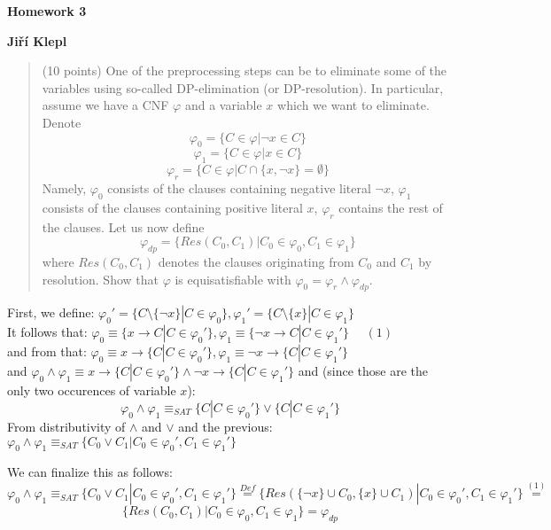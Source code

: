 \documentclass[a4paper,12pt]{article} %
\begin{document}
\begin{center}
    {\Large \bf Homework 3}
    \vspace{2mm}

    {\bf Jiří Klepl}

\end{center}

\vspace{0.4cm}

\begin{quote}
    (10 points) One of the preprocessing steps can be to eliminate some of the variables using so-called
DP-elimination (or DP-resolution). In particular, assume we have a CNF $\varphi$ and a variable $x$ which we want to eliminate. Denote
$$\varphi_0 = \{C \in \varphi | \neg x \in C\}$$
$$\varphi_1 = \{C \in \varphi | x \in C\}$$
$$\varphi_r = \{C \in \varphi | C \cap \{x, \neg x\} = \emptyset\}$$
Namely, $\varphi_0$ consists of the clauses containing negative literal $\neg x$, $\varphi_1$ consists of the clauses containing
positive literal $x$, $\varphi_r$ contains the rest of the clauses. Let us now define
$$\varphi_{dp} = \{Res(C_0, C_1) | C_0 \in \varphi_0, C_1 \in \varphi_1\}$$
where $Res(C_0, C_1)$ denotes the clauses originating from $C_0$ and $C_1$ by resolution. Show that $\varphi$ is equisatisfiable with $\varphi_0 = \varphi_r \wedge \varphi_{dp}$.
\end{quote}

First, we define: $\varphi_0' = \{C \setminus \{\neg x\} | C \in \varphi_0\}, \varphi_1' = \{C \setminus \{x\} | C \in \varphi_1\}$ \\
It follows that: $\varphi_0 \equiv \{x \to C  | C \in \varphi_0'\}, \varphi_1 \equiv \{\neg x \to C | C \in \varphi_1'\}$ $\quad \left(1\right)$\\
and from that: $\varphi_0 \equiv x \to \{C  | C \in \varphi_0'\}, \varphi_1 \equiv \neg x \to \{C  | C \in \varphi_1'\}$ \\
and $\varphi_0 \wedge \varphi_1 \equiv x \to \{C  | C \in \varphi_0'\} \wedge \neg x \to \{C  | C \in \varphi_1'\}$
and (since those are the only two occurences of variable $x$):
$$\varphi_0 \wedge \varphi_1 \equiv_{SAT} \{C  | C \in \varphi_0'\} \vee \{C  | C \in \varphi_1'\}$$
From distributivity of $\wedge$ and $\vee$ and the previous: $\varphi_0 \wedge \varphi_1 \equiv_{SAT} \{C_0 \vee C_1 | C_0 \in \varphi_0', C_1 \in \varphi_1'\}$

We can finalize this as follows: $$\varphi_0 \wedge \varphi_1 \equiv_{SAT} \{C_0 \vee C_1 | C_0 \in \varphi_0', C_1 \in \varphi_1'\} \overset{Def}{=} \{Res(\{\neg x\} \cup C_0, \{x\} \cup C_1) | C_0 \in \varphi_0', C_1 \in \varphi_1'\} \overset{\left(1\right)}{=} $$
$$\{Res(C_0, C_1) | C_0 \in \varphi_0, C_1 \in \varphi_1\} = \varphi_{dp}$$
\end{document}

